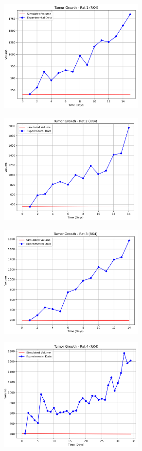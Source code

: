 \documentclass[12pt]{article}
\begin{document}
\begin{figure}[ht]
    \centering
    \includegraphics[width=7.3cm,height=6cm]{pic/a.png}
    \includegraphics[width=7.3cm,height=6cm]{pic/b.png}
    \includegraphics[width=7.3cm,height=6cm]{pic/c.png}
    \includegraphics[width=7.3cm,height=6cm]{pic/d.png}
\end{figure}
\end{document}
